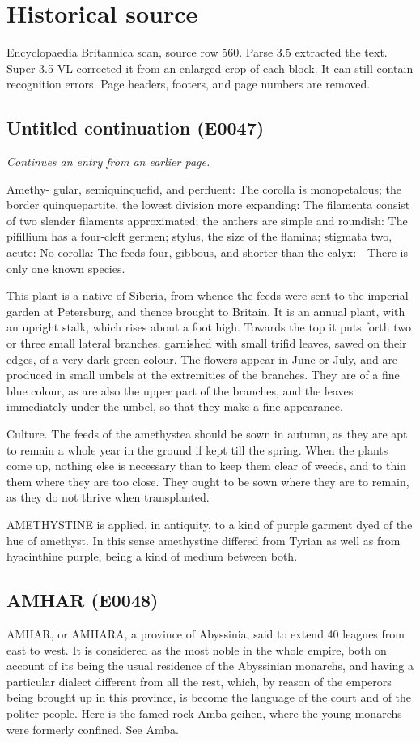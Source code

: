 \documentclass{article}
\begin{document}
\section*{Historical source}
Encyclopaedia Britannica scan, source row 560. Parse 3.5 extracted the text. Super 3.5 VL corrected it from an enlarged crop of each block. It can still contain recognition errors.
Page headers, footers, and page numbers are removed.

\subsection*{Untitled continuation (E0047)}
\textit{Continues an entry from an earlier page.}

Amethy- gular, semiquinquefid, and perfluent: The corolla is monopetalous; the border quinquepartite, the lowest division more expanding: The filamenta consist of two slender filaments approximated; the anthers are simple and roundish: The pifillium has a four-cleft germen; stylus, the size of the flamina; stigmata two, acute: No corolla: The feeds four, gibbous, and shorter than the calyx:—There is only one known species.

This plant is a native of Siberia, from whence the feeds were sent to the imperial garden at Petersburg, and thence brought to Britain. It is an annual plant, with an upright stalk, which rises about a foot high. Towards the top it puts forth two or three small lateral branches, garnished with small trifid leaves, sawed on their edges, of a very dark green colour. The flowers appear in June or July, and are produced in small umbels at the extremities of the branches. They are of a fine blue colour, as are also the upper part of the branches, and the leaves immediately under the umbel, so that they make a fine appearance.

Culture. The feeds of the amethystea should be sown in autumn, as they are apt to remain a whole year in the ground if kept till the spring. When the plants come up, nothing else is necessary than to keep them clear of weeds, and to thin them where they are too close. They ought to be sown where they are to remain, as they do not thrive when transplanted.

AMETHYSTINE is applied, in antiquity, to a kind of purple garment dyed of the hue of amethyst. In this sense amethystine differed from Tyrian as well as from hyacinthine purple, being a kind of medium between both.

\subsection*{AMHAR (E0048)}
AMHAR, or AMHARA, a province of Abyssinia, said to extend 40 leagues from east to west. It is considered as the most noble in the whole empire, both on account of its being the usual residence of the Abyssinian monarchs, and having a particular dialect different from all the rest, which, by reason of the emperors being brought up in this province, is become the language of the court and of the politer people. Here is the famed rock Amba-geihen, where the young monarchs were formerly confined. See Amba.
\end{document}
